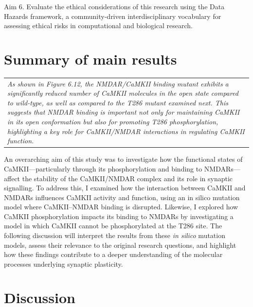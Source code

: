 \documentclass[
  11pt,
  letterpaper,
]{scrreprt}
\begin{document}
Aim 6. Evaluate the ethical considerations of this research using the
Data Hazards framework, a community-driven interdisciplinary vocabulary
for assessing ethical risks in computational and biological research.

\section{Summary of main results}\label{summary-of-main-results}

\begin{longtable}[]{@{}
  >{\raggedright\arraybackslash}p{}@{}}
\toprule\noalign{}
\endhead
\bottomrule\noalign{}
\endlastfoot
\emph{As shown in Figure 6.12, the NMDAR/CaMKII binding mutant exhibits
a significantly reduced number of CaMKII molecules in the open state
compared to wild-type, as well as compared to the T286 mutant examined
next. This suggests that NMDAR binding is important not only for
maintaining CaMKII in its open conformation but also for promoting T286
phosphorylation, highlighting a key role for CaMKII/NMDAR interactions
in regulating CaMKII function.} \\
\end{longtable}

An overarching aim of this study was to investigate how the functional
states of CaMKII---particularly through its phosphorylation and binding
to NMDARs---affect the stability of the CaMKII/NMDAR complex and its
role in synaptic signalling. To address this, I examined how the
interaction between CaMKII and NMDARs influences CaMKII activity and
function, using an in silico mutation model where CaMKII--NMDAR binding
is disrupted. Likewise, I explored how CaMKII phosphorylation impacts
its binding to NMDARs by investigating a model in which CaMKII cannot be
phosphorylated at the T286 site. The following discussion will interpret
the results from these \emph{in silico} mutation models, assess their
relevance to the original research questions, and highlight how these
findings contribute to a deeper understanding of the molecular processes
underlying synaptic plasticity.

\section{Discussion}\label{discussion}
\end{document}

